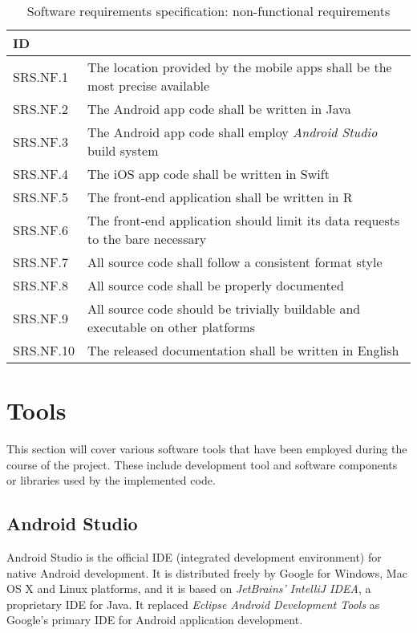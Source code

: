 \begin{table}[H]
\centerfloat
\begin{tabular}{@{} m{4em} >{\small}l @{}}
	\toprule
	ID			& \normalfont{Description} \\
	\midrule
	SRS.NF.1	& The location provided by the mobile apps shall be the most precise available \\
	SRS.NF.2	& The Android app code shall be written in Java \\
	SRS.NF.3	& The Android app code shall employ \emph{Android Studio} build system \\
	SRS.NF.4	& The iOS app code shall be written in Swift \\
	SRS.NF.5	& The front-end application shall be written in R \\
	SRS.NF.6	& The front-end application should limit its data requests to the bare necessary \\
	SRS.NF.7	& All source code shall follow a consistent format style \\
	SRS.NF.8	& All source code shall be properly documented \\
	SRS.NF.9	& All source code should be trivially buildable and executable on other platforms \\
	SRS.NF.10	& The released documentation shall be written in English \\
	\bottomrule
\end{tabular}
\caption{{\footnotesize Software requirements specification: non-functional requirements}}
\end{table}


\section{Tools}
This section will cover various software tools that have been employed during the course of the project.
These include development tool and software components or libraries used by the implemented code.


\subsection{Android Studio}
Android Studio is the official IDE (integrated development environment) for native Android development.
It is distributed freely by Google for Windows, Mac OS X and Linux platforms, and it is based on \emph{JetBrains' IntelliJ IDEA}, a proprietary IDE for Java.
It replaced \emph{Eclipse Android Development Tools} as Google's primary IDE for Android application development.

